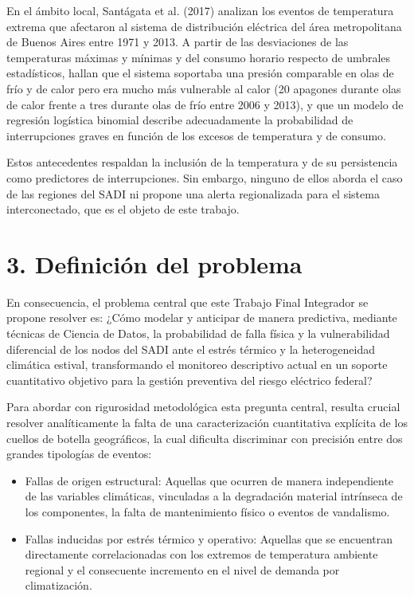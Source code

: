 En el ámbito local, Santágata et al. (2017) analizan los eventos de temperatura extrema que afectaron al sistema de distribución eléctrica del área metropolitana de Buenos Aires entre 1971 y 2013. A partir de las desviaciones de las temperaturas máximas y mínimas y del consumo horario respecto de umbrales estadísticos, hallan que el sistema soportaba una presión comparable en olas de frío y de calor pero era mucho más vulnerable al calor (20 apagones durante olas de calor frente a tres durante olas de frío entre 2006 y 2013), y que un modelo de regresión logística binomial describe adecuadamente la probabilidad de interrupciones graves en función de los excesos de temperatura y de consumo.

Estos antecedentes respaldan la inclusión de la temperatura y de su persistencia como predictores de interrupciones. Sin embargo, ninguno de ellos aborda el caso de las regiones del SADI ni propone una alerta regionalizada para el sistema interconectado, que es el objeto de este trabajo.

\hypertarget{definiciuxf3n-del-problema}{%
\section{3. Definición del problema}\label{definiciuxf3n-del-problema}}

En consecuencia, el problema central que este Trabajo Final Integrador se propone resolver es: ¿Cómo modelar y anticipar de manera predictiva, mediante técnicas de Ciencia de Datos, la probabilidad de falla física y la vulnerabilidad diferencial de los nodos del SADI ante el estrés térmico y la heterogeneidad climática estival, transformando el monitoreo descriptivo actual en un soporte cuantitativo objetivo para la gestión preventiva del riesgo eléctrico federal?

Para abordar con rigurosidad metodológica esta pregunta central, resulta crucial resolver analíticamente la falta de una caracterización cuantitativa explícita de los cuellos de botella geográficos, la cual dificulta discriminar con precisión entre dos grandes tipologías de eventos:

\begin{itemize}
\item
  Fallas de origen estructural: Aquellas que ocurren de manera independiente de las variables climáticas, vinculadas a la degradación material intrínseca de los componentes, la falta de mantenimiento físico o eventos de vandalismo.
\item
  Fallas inducidas por estrés térmico y operativo: Aquellas que se encuentran directamente correlacionadas con los extremos de temperatura ambiente regional y el consecuente incremento en el nivel de demanda por climatización.
\end{itemize}

